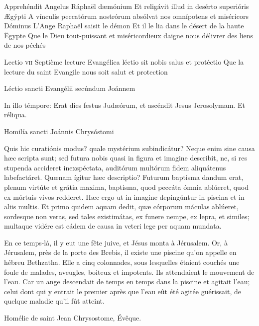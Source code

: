 \documentclass[twoside]{article}
\begin{document}
\begin{paracol}[1]{2}
\switchcolumn*

\versiculusabsolutio
	{Apprehéndit Angelus Ráphaël dæmónium}
	{Et religávit illud in desérto superióris Ægýpti}
	{A vínculis peccatórum nostrórum absólvat nos omnípotens et miséricors Dóminus}
	{L’Ange Raphaël saisit le démon}
	{Et il le lia dans le désert de la haute Ëgypte}
	{Que le Dieu tout-puissant et miséricordieux daigne nous délivrer des liens de nos péchés}

\lectioresponsorium
	{Lectio \textsc{vii}}
	{Septième lecture}
	{Evangélica léctio sit nobis salus et protéctio}
	{Que la lecture du saint Evangile nous soit salut et protection}
	{
		Léctio sancti Evangélii secúndum Joánnem
		
		In illo témpore: Erat dies festus Judæórum, et ascéndit Jesus Jerosolymam. Et réliqua.
		
		Homilía sancti Joánnis Chrysóstomi

		Quis hic curatiónis modus? quale mystérium subindicátur? Neque enim sine causa hæc scripta sunt; sed futura nobis quasi in figura et imagine describit, ne, si res stupenda accideret inexspéctata, auditórum multórum fidem aliquátenus labefactáret. Quænam ígitur hæc descriptio? Futurum baptisma dandum erat, plenum virtúte et grátia maxima, baptisma, quod peccáta ómnia ablúeret, quod ex mórtuis vivos redderet. Hæc ergo ut in imagine depingúntur in piscina et in aliis multis. Et primo quidem aquam dedit, quæ córporum máculas ablúeret, sordesque non veras, sed tales existimátas, ex funere nempe, ex lepra, et similes; multaque vidére est eádem de causa in veteri lege per aquam mundata.
	}
	{
		
		En ce temps-là, il y eut une fête juive, et Jésus monta à Jérusalem.
		Or, à Jérusalem, près de la porte des Brebis, il existe une piscine qu’on appelle en hébreu Bethzatha. Elle a cinq colonnades,
		sous lesquelles étaient couchés une foule de malades, aveugles, boiteux et impotents.
		Ils attendaient le mouvement de l'eau.
		Car un ange descendait de temps en temps dans la piscine et agitait l'eau;
		celui dont qui y entrait le premier après que l'eau eût été agitée guérissait,
		de quelque maladie qu'il fût atteint.
		
		Homélie de saint Jean Chrysostome, Évêque.
		
		
}
\end{paracol}
\end{document}
